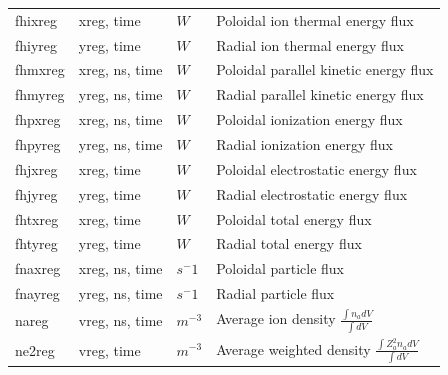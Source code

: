 \documentclass[a4paper,10pt]{report}
\begin{document}
\begin{center}
\begin{longtable}{|l|l|l|l|}
fhixreg \index{fhixreg}\index{b2tallies.nc, fhixreg}                             & xreg, time     & $W$           & Poloidal ion thermal energy flux \\
fhiyreg \index{fhiyreg}\index{b2tallies.nc, fhiyreg}                             & yreg, time     & $W$           & Radial ion thermal energy flux \\
fhmxreg \index{fhmxreg}\index{b2tallies.nc, fhmxreg}                             & xreg, ns, time & $W$           & Poloidal parallel kinetic energy flux \\
fhmyreg \index{fhmyreg}\index{b2tallies.nc, fhmyreg}                             & yreg, ns, time & $W$           & Radial parallel kinetic energy flux \\
fhpxreg \index{fhpxreg}\index{b2tallies.nc, fhpxreg}                             & xreg, ns, time & $W$           & Poloidal ionization energy flux \\
fhpyreg \index{fhpyreg}\index{b2tallies.nc, fhpyreg}                             & yreg, ns, time & $W$           & Radial ionization energy flux \\
fhjxreg \index{fhjxreg}\index{b2tallies.nc, fhjxreg}                             & xreg, time     & $W$           & Poloidal electrostatic energy flux \\
fhjyreg \index{fhjyreg}\index{b2tallies.nc, fhjyreg}                             & yreg, time     & $W$           & Radial electrostatic energy flux \\
fhtxreg \index{fhtxreg}\index{b2tallies.nc, fhtxreg}                             & xreg, time     & $W$           & Poloidal total energy flux \\
fhtyreg \index{fhtyreg}\index{b2tallies.nc, fhtyreg}                             & yreg, time     & $W$           & Radial total energy flux \\
fnaxreg \index{fnaxreg}\index{b2tallies.nc, fnaxreg}                             & xreg, ns, time & $s{^-1}$      & Poloidal particle flux \\
fnayreg \index{fnayreg}\index{b2tallies.nc, fnayreg}                             & yreg, ns, time & ${s^-1}$      & Radial particle flux \\
nareg \index{nareg}\index{b2tallies.nc, nareg}                                   & vreg, ns, time & $m^{-3}$      & Average ion density $\frac{\int n_a dV}{\int dV}$ \\
ne2reg \index{ne2reg}\index{b2tallies.nc, ne2reg}                                & vreg, time     & $m^{-3}$      & Average weighted density $\frac{\int Z_a^2 n_a dV}{\int dV}$ \\

\end{longtable}
\end{center}
\end{document}
